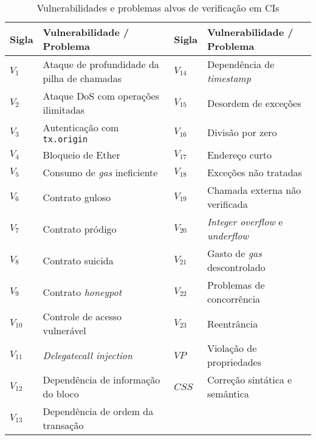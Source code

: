 \begin{table}[!ht]
\centering
\fontsize{8pt}{8pt}\selectfont
\caption{Vulnerabilidades e problemas alvos de verificação em CIs}
\label{tab:rq3-vulnerabilidades}
\begin{tabular}{@{}llll@{}}
\toprule
\textbf{Sigla} & \textbf{Vulnerabilidade / Problema} & \textbf{Sigla} & \textbf{Vulnerabilidade / Problema} \\ \midrule
$V_{1}$  & Ataque de profundidade da pilha de chamadas & $V_{14}$ & Dependência de \textit{timestamp}       \\
$V_{2}$  & Ataque DoS com operações ilimitadas         & $V_{15}$ & Desordem de exceções           \\
$V_{3}$  & Autenticação com \texttt{tx.origin}                  & $V_{16}$ & Divisão por zero               \\
$V_{4}$  & Bloqueio de Ether                           & $V_{17}$ & Endereço curto                 \\
$V_{5}$  & Consumo de \textit{gas} ineficiente                  & $V_{18}$ & Exceções não tratadas          \\
$V_{6}$  & Contrato guloso                             & $V_{19}$ & Chamada externa não verificada \\
$V_{7}$  & Contrato pródigo                            & $V_{20}$ & \textit{Integer overflow} e \textit{underflow}   \\
$V_{8}$  & Contrato suicida                            & $V_{21}$ & Gasto de \textit{gas} descontrolado     \\
$V_{9}$  & Contrato \textit{honeypot}                           & $V_{22}$ & Problemas de concorrência      \\
$V_{10}$ & Controle de acesso vulnerável               & $V_{23}$ & Reentrância                    \\
$V_{11}$ & \textit{Delegatecall injection}             & $VP$  & Violação de propriedades       \\
$V_{12}$ & Dependência de informação do bloco          & $CSS$ & Correção sintática e semântica \\
$V_{13}$ & Dependência de ordem da transação           &       &                                \\ \bottomrule
\end{tabular}
\end{table}